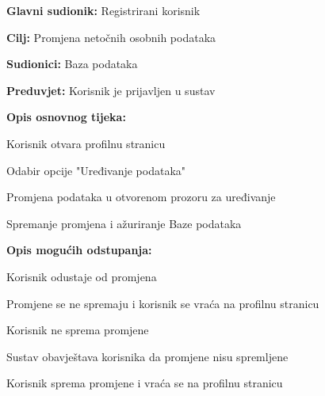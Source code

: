 				\noindent {}
				\begin{packed_item}
					
					\item \textbf{Glavni sudionik: }Registrirani korisnik
					\item  \textbf{Cilj:} Promjena netočnih osobnih podataka
					\item  \textbf{Sudionici:} Baza podataka
					\item  \textbf{Preduvjet:} Korisnik je prijavljen u sustav
					\item  \textbf{Opis osnovnog tijeka:}
					
					\item[] \begin{packed_enum}
						
						\item Korisnik otvara profilnu stranicu
						\item Odabir opcije "Uređivanje podataka"
						\item Promjena podataka u otvorenom prozoru za uređivanje
						\item Spremanje promjena i ažuriranje Baze podataka
					\end{packed_enum}
					
					\item  \textbf{Opis mogućih odstupanja:}
					
					\item[] \begin{packed_item}
						
						\item[4.a] Korisnik odustaje od promjena
						\item[] \begin{packed_enum}
							
							\item Promjene se ne spremaju i korisnik se vraća na profilnu stranicu
							
						\end{packed_enum}	
						\item[4.b] Korisnik ne sprema promjene
						\item[] \begin{packed_enum}
							
							\item Sustav obavještava korisnika da promjene nisu spremljene
							\item Korisnik sprema promjene i vraća se na profilnu stranicu
						\end{packed_enum}	
						
					\end{packed_item}
				\end{packed_item}
				
